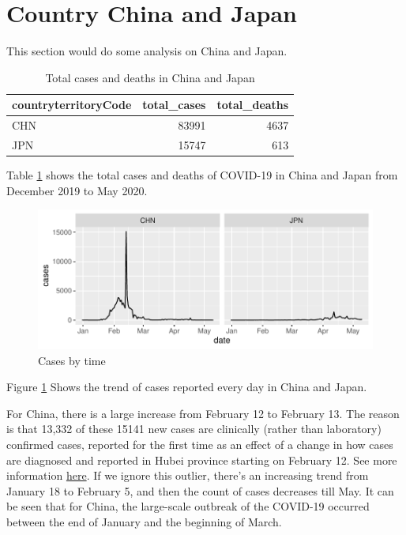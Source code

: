 \documentclass[11pt,a4paper,]{article}
\begin{document}
\clearpage

\section*{Country China and Japan}

This section would do some analysis on China and Japan.

\begin{table}

\caption{\label{tab:tab1}Total cases and deaths in China and Japan}
\centering
\begin{tabular}[t]{l|r|r}
\hline
countryterritoryCode & total\_cases & total\_deaths\\
\hline
CHN & 83991 & 4637\\
\hline
JPN & 15747 & 613\\
\hline
\end{tabular}
\end{table}

Table \ref{tab:tab1} shows the total cases and deaths of COVID-19 in China and Japan from December 2019 to May 2020.

\clearpage

\begin{figure}

{\centering \includegraphics{report_files/figure-latex/fig1-1} 

}

\caption{Cases by time}\label{fig:fig1}
\end{figure}

Figure \ref{fig:fig1} Shows the trend of cases reported every day in China and Japan.

For China, there is a large increase from February 12 to February 13. The reason is that 13,332 of these 15141 new cases are clinically (rather than laboratory) confirmed cases, reported for the first time as an effect of a change in how cases are diagnosed and reported in Hubei province starting on February 12. See more information \href{https://www.worldometers.info/coronavirus/how-to-interpret-feb-12-case-surge/}{here}. If we ignore this outlier, there's an increasing trend from January 18 to February 5, and then the count of cases decreases till May. It can be seen that for China, the large-scale outbreak of the COVID-19 occurred between the end of January and the beginning of March.
\end{document}

